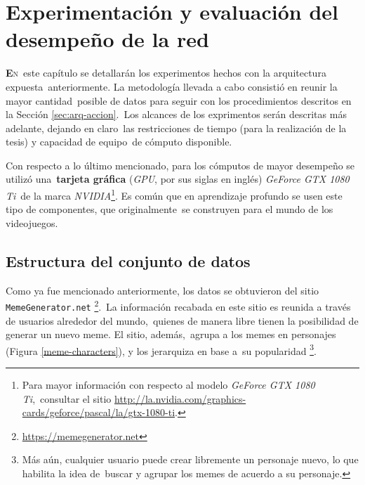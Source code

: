 \chapter{Experimentación y evaluación del desempeño de la red}

\noindent
\lettrine[lines=2, lhang=0.33, loversize=0.25]{\textbf{E}}{n}\
este capítulo se detallarán los experimentos hechos con la arquitectura expuesta\
anteriormente. La metodología llevada a cabo consistió en reunir la mayor cantidad\
posible de datos para seguir con los procedimientos descritos en la Sección \ref{sec:arq-accion}.\
Los alcances de los exprimentos serán descritas más adelante, dejando en claro\
las restricciones de tiempo (para la realización de la tesis) y capacidad de equipo\
de cómputo disponible.\par
Con respecto a lo último mencionado, para los cómputos de mayor desempeño se utilizó una\
\textbf{tarjeta gráfica} (\emph{GPU}, por sus siglas en inglés) \emph{GeForce GTX 1080 Ti}\
de la marca \emph{NVIDIA}\footnote{
  Para mayor información con respecto al modelo \emph{GeForce GTX 1080 Ti},\
  consultar el sitio \url{http://la.nvidia.com/graphics-cards/geforce/pascal/la/gtx-1080-ti}.
}. Es común que en aprendizaje profundo se usen este tipo de componentes, que originalmente\
se construyen para el mundo de los videojuegos.

\section{Estructura del conjunto de datos} \label{sec:dataset}

\noindent
Como ya fue mencionado anteriormente, los datos se obtuvieron del sitio \verb+MemeGenerator.net+%
\footnote{\url{https://memegenerator.net}}.\
La información recabada en este sitio es reunida a través de usuarios alrededor del mundo,\
quienes de manera libre tienen la posibilidad de generar un nuevo meme. El sitio, además,\
agrupa a los memes en personajes (Figura \ref{meme-characters}), y los jerarquiza en base a\
su popularidad%
\footnote{
  Más aún, cualquier usuario puede crear libremente un personaje nuevo, lo que habilita la idea de\
  buscar y agrupar los memes de acuerdo a su personaje.
}.

